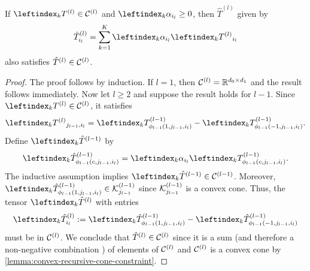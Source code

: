\begin{lemma}\label{lemma:cone-scaling}
    If \( \leftindex_{k}{\Tl} \in \calCl \) and
    \( \leftindex_{k}{\alpha}_{i_{l}} \geq 0 \), then \( \hat{T}^{(l)} \) given
    by
    \begin{equation*}
        \hat{T}^{(l)}_{i_{l}}
        = \sum_{k=1}^{K}
        \leftindex_{k}{\alpha}_{i_{l}} \leftindex_{k}{\Tl}_{i_{l}}
    \end{equation*}
    also satisfies \( \hat{T}^{(l)} \in \mathcal{C}^{(l)} \).
\end{lemma}
\begin{proof}
    The proof follows by induction.
    If \( l = 1 \), then \( \mathcal{C}^{(l)} = \mathbb{R}^{d_0 \times d_1} \) and the result
    follows immediately.
    Now let \( l \geq 2 \) and suppose the result holds for \( l - 1 \).
    Since \( \leftindex_{k}{\Tl} \in \calCl \), it satisfies
    \[
        \leftindex_{k}{\Tl}_{j_{l-1}, i_l}
        = \leftindex_{k}{T}^{(l-1)}_{\phi_{l-1}(1, j_{l-1}, i_l)}
        - \leftindex_{k}{T}^{(l-1)}_{\phi_{l-1}(-1, j_{l-1}, i_l)}.
    \]
    Define \( \leftindex_{k}{\hat{T}}^{(l-1)} \) by
    \[
        \leftindex_{k}{\hat{T}}^{(l-1)}_{\phi_{l-1}(c, j_{l-1}, i_l)}
        = \leftindex_{k}{\alpha}_{i_{l}} \leftindex_{k}{T}^{(l-1)}_{\phi_{l-1}(c, j_{l-1}, i_l)}.
    \]
    The inductive assumption implies
    \( \leftindex_{k}{\hat{T}}^{(l-1)} \in \calC^{(l-1)} \).
    Moreover,
    \( \leftindex_{k}{\hat{T}}^{(l-1)}_{\phi_{l-1}(1, j_{l-1}, i_l)}
    \in \calK^{(l-1)}_{j_{l-1}} \) since \( \mathcal{K}^{(l-1)}_{j_{l-1}} \) is a
    convex cone.
    Thus, the tensor \( \leftindex_{k}{\hat{T}}^{(l)} \) with entries
    \begin{equation*}
        \leftindex_{k}{\hat{T}}^{(l)}_{i_{l}} :=
        \leftindex_{k}{\hat{T}}^{(l-1)}_{\phi_{l-1}(1, j_{l-1}, i_l)}
        - \leftindex_{k}{\hat{T}}^{(l-1)}_{\phi_{l-1}(-1, j_{l-1}, i_l)}
    \end{equation*}
    must be in \( \mathcal{C}^{(l)} \).
    We conclude that \( \hat{T}^{(l)} \in \mathcal{C}^{(l)} \) since it is a sum (and
    therefore a non-negative combination ) of elements of \( \mathcal{C}^{(l)} \) and \(
    \mathcal{C}^{(l)} \) is a convex cone by
    \cref{lemma:convex-recursive-cone-constraint}.
\end{proof}

